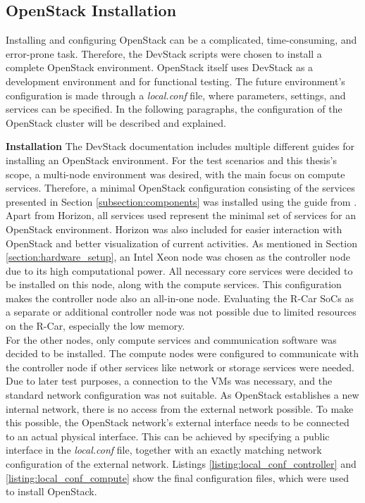             
            
        \subsection{OpenStack Installation}
        \label{subsection:openstack_installation}
            
            Installing and configuring OpenStack can be a complicated, time-consuming, and error-prone task.
            Therefore, the DevStack scripts were chosen to install a complete OpenStack environment.
            OpenStack itself uses DevStack as a development environment and for functional testing.
            The future environment's configuration is made through a \textsl{local.conf} file, where parameters, settings, and services can be specified.
            In the following paragraphs, the configuration of the OpenStack cluster will be described and explained.
            
             \noindent \textbf{Installation}
            The DevStack documentation includes multiple different guides for installing an OpenStack environment.
            For the test scenarios and this thesis's scope, a multi-node environment was desired, with the main focus on compute services.
            Therefore, a minimal OpenStack configuration consisting of the services presented in Section \ref{subsection:components} was installed using the guide from \cite{OpenStackMNL2020}.
            Apart from Horizon, all services used represent the minimal set of services for an OpenStack environment.
            Horizon was also included for easier interaction with OpenStack and better visualization of current activities.
            As mentioned in Section \ref{section:hardware_setup}, an Intel Xeon node was chosen as the controller node due to its high computational power.
            All necessary core services were decided to be installed on this node, along with the compute services.
            This configuration makes the controller node also an all-in-one node.
            Evaluating the R-Car \acp{SoC} as a separate or additional controller node was not possible due to limited resources on the R-Car, especially the low memory.\\
            For the other nodes, only compute services and communication software was decided to be installed.
            The compute nodes were configured to communicate with the controller node if other services like network or storage services were needed.
            Due to later test purposes, a connection to the \acp{VM} was necessary, and the standard network configuration was not suitable.
            As OpenStack establishes a new internal network, there is no access from the external network possible.
            To make this possible, the OpenStack network's external interface needs to be connected to an actual physical interface.
            This can be achieved by specifying a public interface in the \textsl{local.conf} file, together with an exactly matching network configuration of the external network.
            Listings \ref{listing:local_conf_controller} and \ref{listing:local_conf_compute} show the final configuration files, which were used to install OpenStack.
                        
